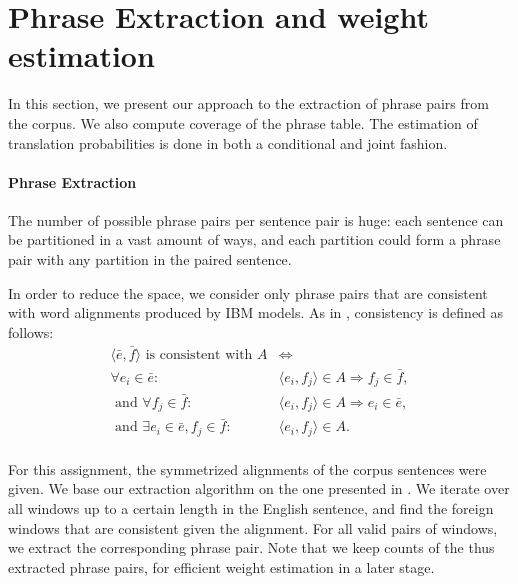 \documentclass[11pt]{article}
\begin{document}
\section{Phrase Extraction and weight estimation}
\label{phraseExtraction}

In this section, we present our approach to the extraction of phrase pairs from the corpus. We also compute coverage of the phrase table. The estimation of translation probabilities is done in both a conditional and joint fashion.

\paragraph{Phrase Extraction}
The number of possible phrase pairs per sentence pair is huge: each sentence can be partitioned in a vast amount of ways, and each partition could form a phrase pair with any partition in the paired sentence. 

In order to reduce the space, we consider only phrase pairs that are consistent with word alignments produced by IBM models.
As in \cite{Koehn:2010}, consistency is defined as follows:
\begin{align*}
\langle \bar{e},\bar{f}\rangle\text{ is consistent with }A &\Leftrightarrow\\
\forall e_i\in \bar{e}: &\langle e_i,f_j\rangle \in A \Rightarrow f_j \in \bar{f}, \\
\text{ and }\forall f_j\in \bar{f}: &\langle e_i,f_j\rangle \in A \Rightarrow e_i \in \bar{e}, \\
\text{ and }\exists e_i \in \bar{e}, f_j\in \bar{f}: &\langle e_i,f_j\rangle \in A.\\
\end{align*}

For this assignment, the symmetrized alignments of the corpus sentences were given. 
We base our extraction algorithm on the one presented in \cite[page 133]{Koehn:2010}.
We iterate over all windows up to a certain length in the English sentence, and find the foreign windows that are consistent given the alignment. For all valid pairs of windows, we extract the corresponding phrase pair. Note that we keep counts of the thus extracted phrase pairs, for efficient weight estimation in a later stage.

\end{document}
